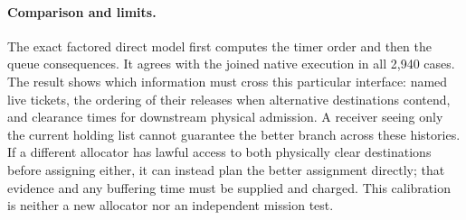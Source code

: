 \documentclass{article}
\begin{document}
\paragraph{Comparison and limits.}
The exact factored direct model first computes the timer order and then the queue consequences. It agrees with the joined native execution in all 2,940 cases. The result shows which information must cross this particular interface: named live tickets, the ordering of their releases when alternative destinations contend, and clearance times for downstream physical admission. A receiver seeing only the current holding list cannot guarantee the better branch across these histories. If a different allocator has lawful access to both physically clear destinations before assigning either, it can instead plan the better assignment directly; that evidence and any buffering time must be supplied and charged. This calibration is neither a new allocator nor an independent mission test.
\end{document}
